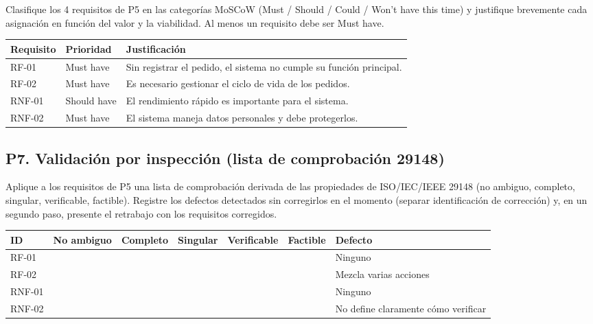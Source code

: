 \documentclass[11pt,a4paper]{article}
\newcommand{\cmark}{\textcolor{green!60!black}{\checkmark}}
\newcommand{\xmark}{\textcolor{red}{\ding{55}}}
\begin{document}
Clasifique los 4 requisitos de P5 en las categorías MoSCoW (Must / Should / Could / Won't have
this time) y justifique brevemente cada asignación en función del valor y la viabilidad. Al menos
un requisito debe ser Must have.

\begin{center}
\begin{tabular}{|l|l|p{8cm}|}
\hline
\rowcolor{tablehead}
\textbf{Requisito} & \textbf{Prioridad} & \textbf{Justificación} \\
\hline
RF-01  & Must have   & Sin registrar el pedido, el sistema no cumple su función principal. \\
\hline
RF-02  & Must have   & Es necesario gestionar el ciclo de vida de los pedidos. \\
\hline
RNF-01 & Should have & El rendimiento rápido es importante para el sistema. \\
\hline
RNF-02 & Must have   & El sistema maneja datos personales y debe protegerlos. \\
\hline
\end{tabular}
\end{center}

\subsection*{P7. Validación por inspección (lista de comprobación 29148)}

Aplique a los requisitos de P5 una lista de comprobación derivada de las propiedades de
ISO/IEC/IEEE 29148 (no ambiguo, completo, singular, verificable, factible). Registre los defectos
detectados sin corregirlos en el momento (separar identificación de corrección) y, en un segundo
paso, presente el retrabajo con los requisitos corregidos.

\begin{center}
\begin{tabular}{|l|c|c|c|c|c|p{4cm}|}
\hline
\rowcolor{tablehead}
\textbf{ID} & \textbf{No ambiguo} & \textbf{Completo} & \textbf{Singular} & \textbf{Verificable} & \textbf{Factible} & \textbf{Defecto} \\
\hline
RF-01  & \cmark & \cmark & \cmark & \cmark & \cmark & Ninguno \\
\hline
RF-02  & \xmark & \cmark & \xmark & \cmark & \cmark & Mezcla varias acciones \\
\hline
RNF-01 & \cmark & \cmark & \cmark & \cmark & \cmark & Ninguno \\
\hline
RNF-02 & \xmark & \cmark & \cmark & \xmark & \cmark & No define claramente cómo verificar \\
\hline
\end{tabular}
\end{center}
\end{document}
